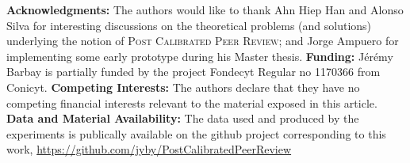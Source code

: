 \documentclass[usletter]{llncs}
\begin{document}
\medskip 
\textbf{Acknowledgments:} The authors would like to thank 
%
Ahn Hiep Han and Alonso Silva for interesting discussions on the theoretical problems (and solutions) underlying the notion of \textsc{Post Calibrated Peer Review}; and
%
Jorge Ampuero for implementing some early prototype during his Master thesis.
% 
\textbf{Funding:} J\'er\'emy Barbay is partially funded by 
the project Fondecyt Regular no 1170366 from Conicyt.
%
%
\textbf{Competing Interests:} The authors declare that they have no competing financial interests relevant to the material exposed in this article.
%
\textbf{Data and Material Availability:}
%
The data used and produced by the experiments is publically available on the github project corresponding to this work, \url{https://github.com/jyby/PostCalibratedPeerReview}


\end{document}
